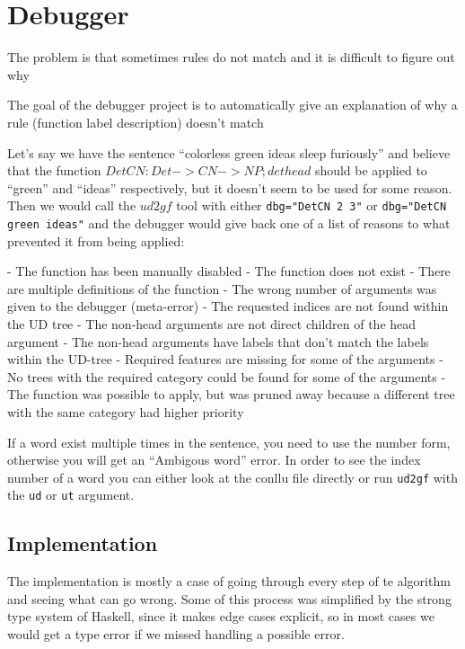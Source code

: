\chapter{Debugger}

The problem is that sometimes rules do not match and it is difficult to figure out why

The goal of the debugger project is to automatically give an explanation of why a rule (function label description) doesn't match




Let's say we have the sentence ``colorless green ideas sleep furiously'' and believe that the function $DetCN : Det -> CN -> NP ; det head$ should be applied to ``green'' and ``ideas'' respectively, but it doesn't seem to be
used for some reason. Then we would call the $ud2gf$ tool with either \verb|dbg="DetCN 2 3"| or \verb|dbg="DetCN green ideas"| and the debugger would give back one of a list of reasons to what prevented it from being applied:

- The function has been manually disabled
- The function does not exist
- There are multiple definitions of the function
- The wrong number of arguments was given to the debugger (meta-error)
- The requested indices are not found within
  the UD tree
- The non-head arguments are not direct children of the head argument
- The non-head arguments have labels that don't match the labels within the UD-tree
- Required features are missing for some of the arguments
- No trees with the required category could be found for some of the arguments
- The function was possible to apply, but was pruned away because a different tree with the same category had higher priority

If a word exist multiple times in the sentence, you need to use the number form, otherwise you will get an ``Ambigous word'' error. In order to see the index number of a word you can either look at the conllu file directly or run \verb|ud2gf| with the \verb|ud| or \verb|ut| argument.


\section{Implementation}

The implementation is mostly a case of going through every step of te algorithm and seeing what can go wrong. Some of this process was simplified by the strong type system of Haskell, since it makes edge cases explicit, so in most cases we would get a type error if we missed handling a possible error.

